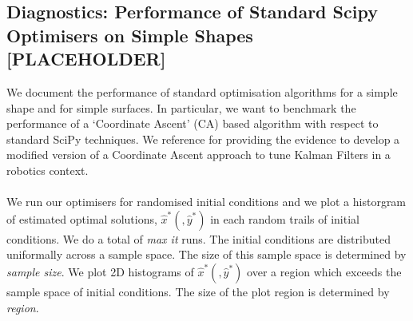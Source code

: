 \subsection{Diagnostics: Performance of Standard Scipy Optimisers on Simple Shapes [PLACEHOLDER]} \label{sec:ap_opt_diagnostics}

We document the performance of standard optimisation algorithms for a simple shape and for simple surfaces. In particular, we want to benchmark the performance of a `Coordinate Ascent' (CA) based algorithm with respect to standard SciPy techniques. We reference \cite{abbeel2005discriminative} for providing the evidence to develop a modified version of a Coordinate Ascent approach to tune Kalman Filters in a robotics context.
\\
\\
We run our optimisers for randomised initial conditions and we plot a historgram of estimated optimal solutions,  $\hat{x}^* (, \hat{y}^*)$ in each random trails of initial conditions.  We do a total of \textit{max it} runs. The initial conditions are distributed uniformally across a sample space. The size of this sample space is determined by \textit{sample size}. We plot 2D histograms of $\hat{x}^* (, \hat{y}^*)$ over a region which exceeds the sample space of initial conditions. The size of the plot region is determined by \textit{region}.
\\
\\
